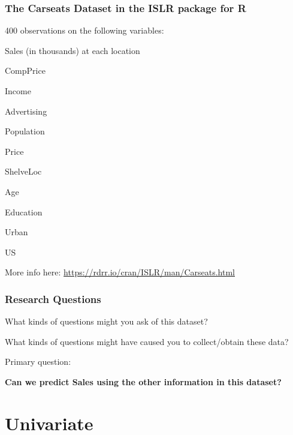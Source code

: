 \begin{frame}
\frametitle{The Carseats Dataset in the ISLR package for R}
\bi
	\item 400 observations on the following variables:
	\bi
		\item Sales (in thousands) at each location
		\item CompPrice
		\item Income
		\item Advertising
		\item Population
		\item Price
		\item ShelveLoc
		\item Age
		\item Education
		\item Urban
		\item US
	\ei
	\item More info here: \url{https://rdrr.io/cran/ISLR/man/Carseats.html}
\ei
\end{frame}

\begin{frame}
\frametitle{Research Questions}
\bi
	\item What kinds of questions might you ask of this dataset?
	\item What kinds of questions might have caused you to collect/obtain these data?
	\pause
	\item Primary question:
\ei

\pause

\begin{center}
	\textbf{Can we predict Sales using the other information in this dataset?}
\end{center}
\end{frame}

\section[Univariate]{Univariate}

\subsection{}

